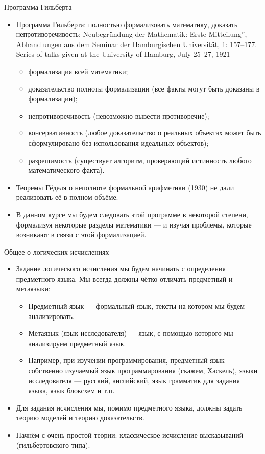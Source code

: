 \documentclass[aspectratio=169]{beamer}
\begin{document}
\begin{frame}{Программа Гильберта}
\begin{itemize}
\item Программа Гильберта: полностью формализовать математику, доказать непротиворечивость:
Neubegründung der Mathematik: Erste Mitteilung”, Abhandlungen aus dem Seminar der Hamburgischen Universität, 1: 157–177. Series of talks given at the University of Hamburg, July 25–27, 1921

\begin{itemize}
\item формализация всей математики;
\item доказательство полноты формализации (все факты могут быть доказаны в формализации);
\item непротиворечивость (невозможно вывести противоречие);
\item консервативность (любое доказательство о реальных объектах может быть сформулировано без использования идеальных объектов);
\item разрешимость (существует алгоритм, проверяющий истинность любого математического факта).
\end{itemize}

\item Теоремы Гёделя о неполноте формальной арифметики (1930) не дали реализовать её в полном объёме.
\item В данном курсе мы будем следовать этой программе в некоторой степени, 
формализуя некоторые разделы математики --- и изучая проблемы, которые возникают в связи с этой формализацией.
\end{itemize}
\end{frame}

\begin{frame}{Общее о логических исчислениях}
\begin{itemize}
\item Задание логического исчисления мы будем начинать с определения предметного языка. 
Мы всегда должны чётко отличать предметный и метаязыки:
\begin{itemize}
\item Предметный язык --- формальный язык, тексты на котором мы будем анализировать.
\item Метаязык (язык исследователя) --- язык, с помощью которого мы анализируем предметный язык.
\item Например, при изучении программирования, предметный язык --- собственно изучаемый язык
программирования (скажем, Хаскель), языки исследователя --- русский, английский, язык грамматик
для задания языка, язык блоксхем и т.п.
\end{itemize}
\item Для задания исчисления мы, помимо предметного языка, должны задать теорию моделей и теорию доказательств.
\item Начнём с очень простой теории: классическое исчисление высказываний (гильбертовского типа).
\end{itemize}
\end{frame}
\end{document}
